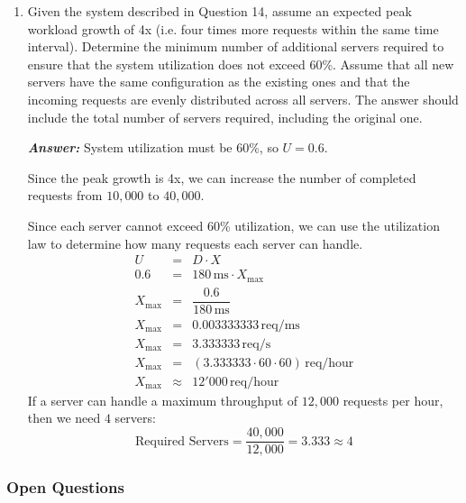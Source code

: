 \begin{enumerate}
    \item Given the system described in Question 14, assume an expected peak workload growth of 4x (i.e. four times more requests within the same time interval). Determine the minimum number of additional servers required to ensure that the system utilization does not exceed 60\%. Assume that all new servers have the same configuration as the existing ones and that the incoming requests are evenly distributed across all servers. The answer should include the total number of servers required, including the original one.
    
    \textcolor{Green3}{\emph{\textbf{Answer:}}} System utilization must be 60\%, so $U = 0.6$.

    Since the peak growth is 4x, we can increase the number of completed requests from $10,000$ to $40,000$.

    Since each server cannot exceed 60\% utilization, we can use the utilization law to determine how many requests each server can handle.
    \begin{equation*}
        \begin{array}{rcl}
            U &=& D \cdot X \\ [.3em]
            0.6 &=& 180 \, \text{ms} \cdot X_{\max} \\ [.4em]
            X_{\max} &=& \dfrac{0.6}{180 \, \text{ms}} \\ [1em]
            X_{\max} &=& 0.003333333 \, \text{req/ms} \\ [.3em]
            X_{\max} &=& 3.333333 \, \text{req/s} \\ [.3em]
            X_{\max} &=& \left(3.333333 \cdot 60 \cdot 60\right) \, \text{req/hour} \\ [.3em]
            X_{\max} &\approx& 12'000 \, \text{req/hour}
        \end{array}
    \end{equation*}
    If a server can handle a maximum throughput of $12,000$ requests per hour, then we need $4$ servers:
    \begin{equation*}
        \text{Required Servers} = \dfrac{40,000}{12,000} = 3.333 \approx 4
    \end{equation*}
\end{enumerate}

\subsubsection*{Open Questions}

